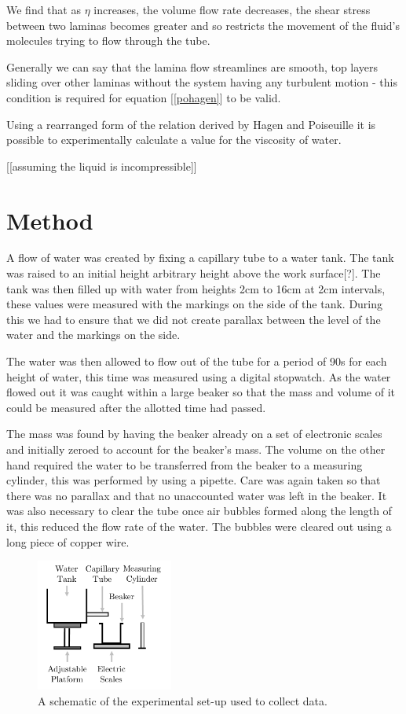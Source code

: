 \documentclass[twocolumn]{revtex4}
\begin{document}
We find that as $\eta$ increases, the volume flow rate decreases, the shear stress between two laminas becomes greater and so restricts the movement of the fluid's molecules trying to flow through the tube. 

Generally we can say that the lamina flow streamlines are smooth, top layers sliding over other laminas without the system having any turbulent motion - this condition is required for equation [\ref{pohagen}] to be valid. 

Using a rearranged form of the relation derived by Hagen and Poiseuille it is possible to experimentally calculate a value for the viscosity of water.

[[assuming the liquid is incompressible]]

\vspace{-3ex}
\section{Method} 
\vspace{-2ex}
A flow of water was created by fixing a capillary tube to a water tank. The tank was raised to an initial height arbitrary height above the work surface[?]. The tank was then filled up with water from heights 2cm to 16cm at 2cm intervals, these values were measured with the markings on the side of the tank. During this we had to ensure that we did not create parallax between the level of the water and the markings on the side. 

The water was then allowed to flow out of the tube for a period of 90s for each height of water, this time was measured using a digital stopwatch. As the water flowed out it was caught within a large beaker so that the mass and volume of it could be measured after the allotted time had passed. 

The mass was found by having the beaker already on a set of electronic scales and initially zeroed to account for the beaker's mass. The volume on the other hand required the water to be transferred from the beaker to a measuring cylinder, this was performed by using a pipette. Care was again taken so that there was no parallax and that no unaccounted water was left in the beaker. It was also necessary to clear the tube once air bubbles formed along the length of it, this reduced the flow rate of the water. The bubbles were cleared out using a long piece of copper wire. 

\begin{figure}[!h]
\begin{center}
\includegraphics[width=4.5cm]{fig1}
\caption[]{A schematic of the experimental set-up used to collect data. }
\label{fig:fig1}
\end{center}
\end{figure}
\end{document}
